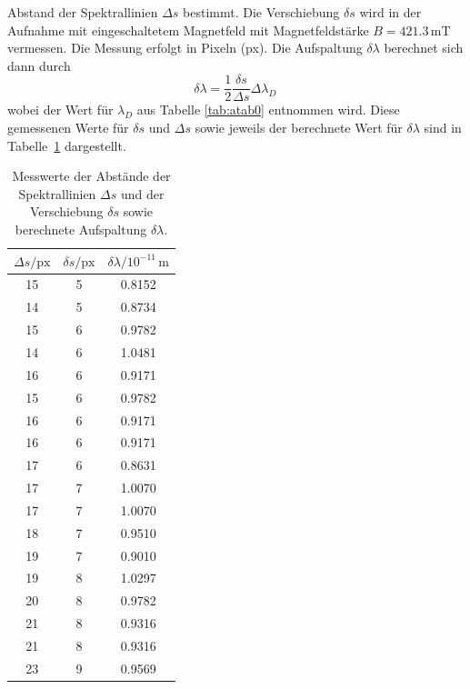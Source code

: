 Abstand der Spektrallinien $\Delta s$ bestimmt. Die Verschiebung $\delta s$ wird in der Aufnahme mit eingeschaltetem 
Magnetfeld mit Magnetfeldstärke $B = 421.3 \,\si{\milli\tesla}$ vermessen. Die Messung erfolgt in Pixeln (px).
Die Aufspaltung $\delta \lambda$ berechnet 
sich dann durch
\begin{equation}
    \label{eq:Auswertung}
    \delta \lambda = \frac{1}{2} \frac{\delta s}{\Delta s} \Delta \lambda_D \,
\end{equation}
wobei der Wert für $\lambda_D$ aus Tabelle \ref{tab:atab0} entnommen wird. 
Diese gemessenen Werte für $\delta s$ und $\Delta s$ sowie jeweils der berechnete Wert für $\delta \lambda$ sind in Tabelle \ref{tab:atab2} dargestellt.
\FloatBarrier
\begin{table}[h]
    \centering
    \caption{Messwerte der Abstände der Spektrallinien $\Delta s$ und der Verschiebung $\delta s$ sowie berechnete Aufspaltung $\delta \lambda$.}
    \label{tab:atab2}
    \begin{tabular}{c c c}
        \toprule
        {$\Delta s / \text{px}$} & {$\delta s / \text{px}$} & {$\delta \lambda / 10^{-11}\, \si{\meter}$}\\
        \midrule
        15 & 5 & 0.8152 \\ 
        14 & 5 & 0.8734 \\
        15 & 6 & 0.9782 \\
        14 & 6 & 1.0481 \\
        16 & 6 & 0.9171 \\
        15 & 6 & 0.9782 \\
        16 & 6 & 0.9171 \\ 
        16 & 6 & 0.9171 \\
        17 & 6 & 0.8631 \\ 
        17 & 7 & 1.0070 \\ 
        17 & 7 & 1.0070 \\
        18 & 7 & 0.9510 \\
        19 & 7 & 0.9010 \\
        19 & 8 & 1.0297 \\
        20 & 8 & 0.9782 \\
        21 & 8 & 0.9316 \\
        21 & 8 & 0.9316 \\
        23 & 9 & 0.9569 \\
        \bottomrule
    \end{tabular}
\end{table}
\FloatBarrier
\noindent
